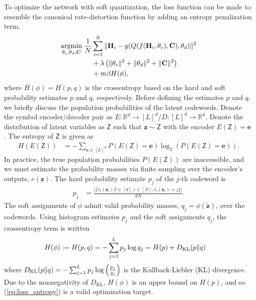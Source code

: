 To optimize the network with soft quantization, the loss function can be made to resemble the canonical rate-distortion function by adding an entropy penalization term,
\begin{align}
\underset{\theta_e, \theta_d, \mathbf C}{\text{argmin}}\; \frac 1N &\sum_{i=1}^N\Arrowvert \mathbf H_i - g(Q(f(\mathbf H_i, \theta_e), \mathbf C), \theta_d) \Arrowvert^2 \nonumber \\
&+ \lambda \left(\Arrowvert\theta_e\Arrowvert^2+\Arrowvert\theta_d\Arrowvert^2+\Arrowvert \mathbf C \Arrowvert^2\right) \label{eq:loss_entropy} \\
&+ m\beta H(\phi), \nonumber
\end{align}
where $H(\phi)=H(p,q)$ is the crossentropy based on the hard and soft probability estimates $p$ and $q$, respectively. Before defining the estimates $p$ and $q$, we briefly discuss the population probabilities of the latent codewords. Denote the symbol encoder/decoder pair as $E:\mathbb R^d \to [L]^d$/$D:[L]^d \to \mathbb R^d$. Denote the distribution of latent variables as $\mathsf Z$ such that $\mathbf z \sim \mathsf Z$ with the encoder $E(\mathsf Z)=\mathbf e$ . The entropy of $\mathsf Z$ is given as 
\begin{align*}
H(E(\mathsf Z)) &= -\sum_{\mathbf e\in[L]^d}P(E(\mathsf Z) = \mathbf e)\log_2(P(E(\mathsf Z)=\mathbf e)).
\end{align*}
In practice, the true population probabilities $P(E(\mathsf Z))$ are inaccessible, and we must estimate the probability masses via finite sampling over the encoder's outputs, $e(\mathbf z)$. The hard probability estimate $p_j$ of the $j$-th codeword is
\begin{align*}
p_j &= \frac{|\{e_l(\mathbf z_i)|l\in[d], i \in [N], e_l(\mathbf z_i)=j\}|}{dN}.
\end{align*}
The soft assignments of $\phi$ admit valid probability masses, $q_j = \phi(\tilde{\mathbf z})$, over the codewords. Using histogram estimates $p_j$ and the soft assignments $q_j$, the crossentropy term is written
\begin{align*}
H(\phi) := H(p,q) &= -\sum_{j=1}^L p_j\log q_j = H(p) + D_{\text{KL}}(p\Arrowvert q)
\end{align*}
where $D_{\text{KL}}(p\Arrowvert q)=-\sum_{j=1}^L p_j \log\left(\frac{p_j}{q_j}\right)$ is the Kullback-Liebler (KL) divergence. Due to the nonnegativity of $D_{\text{KL}}$, $H(\phi)$ is an upper bound on $H(p)$, and so (\ref{eq:loss_entropy}) is a valid optimization target.
